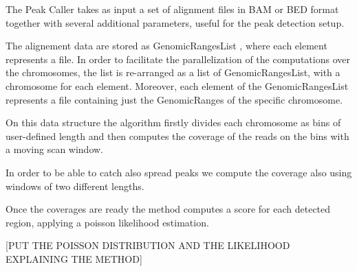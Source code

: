 The Peak Caller takes as input a set of alignment files in BAM \cite{Li2009} or BED format together with several additional parameters, useful for the peak detection setup.

The alignement data are stored as GenomicRangesList \cite{Lawrence2013}, where each element represents a file. 
In order to facilitate the parallelization of the computations over the chromosomes, the list is re-arranged as a list of GenomicRangesList, with a chromosome for each element.
Moreover, each element of the GenomicRangesList represents a file containing just the GenomicRanges of the specific chromosome.

On this data structure the algorithm firstly divides each chromosome as bins of user-defined length and then computes the coverage of the reads on the bins with a moving scan window.

In order to be able to catch also spread peaks we compute the coverage also using windows of two different lengths.

Once the coverages are ready the method computes a score for each detected region, applying a poisson likelihood estimation.

[PUT THE POISSON DISTRIBUTION AND THE LIKELIHOOD EXPLAINING THE METHOD]


